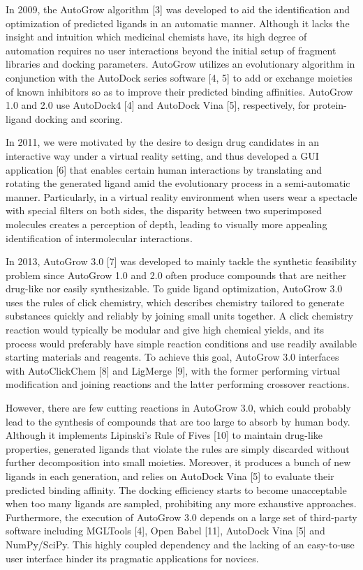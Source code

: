 In 2009, the AutoGrow algorithm [3] was developed to aid the identification and optimization of predicted ligands in an automatic manner. Although it lacks the insight and intuition which medicinal chemists have, its high degree of automation requires no user interactions beyond the initial setup of fragment libraries and docking parameters. AutoGrow utilizes an evolutionary algorithm in conjunction with the AutoDock series software [4, 5] to add or exchange moieties of known inhibitors so as to improve their predicted binding affinities. AutoGrow 1.0 and 2.0 use AutoDock4 [4] and AutoDock Vina [5], respectively, for protein-ligand docking and scoring.

In 2011, we were motivated by the desire to design drug candidates in an interactive way under a virtual reality setting, and thus developed a GUI application [6] that enables certain human interactions by translating and rotating the generated ligand amid the evolutionary process in a semi-automatic manner. Particularly, in a virtual reality environment when users wear a spectacle with special filters on both sides, the disparity between two superimposed molecules creates a perception of depth, leading to visually more appealing identification of intermolecular interactions.

In 2013, AutoGrow 3.0 [7] was developed to mainly tackle the synthetic feasibility problem since AutoGrow 1.0 and 2.0 often produce compounds that are neither drug-like nor easily synthesizable. To guide ligand optimization, AutoGrow 3.0 uses the rules of click chemistry, which describes chemistry tailored to generate substances quickly and reliably by joining small units together. A click chemistry reaction would typically be modular and give high chemical yields, and its process would preferably have simple reaction conditions and use readily available starting materials and reagents. To achieve this goal, AutoGrow 3.0 interfaces with AutoClickChem [8] and LigMerge [9], with the former performing virtual modification and joining reactions and the latter performing crossover reactions.

However, there are few cutting reactions in AutoGrow 3.0, which could probably lead to the synthesis of compounds that are too large to absorb by human body. Although it implements Lipinski's Rule of Fives [10] to maintain drug-like properties, generated ligands that violate the rules are simply discarded without further decomposition into small moieties. Moreover, it produces a bunch of new ligands in each generation, and relies on AutoDock Vina [5] to evaluate their predicted binding affinity. The docking efficiency starts to become unacceptable when too many ligands are sampled, prohibiting any more exhaustive approaches. Furthermore, the execution of AutoGrow 3.0 depends on a large set of third-party software including MGLTools [4], Open Babel [11], AutoDock Vina [5] and NumPy/SciPy. This highly coupled dependency and the lacking of an easy-to-use user interface hinder its pragmatic applications for novices.

